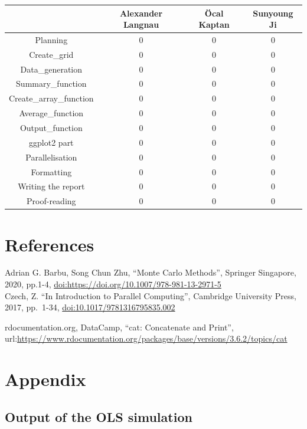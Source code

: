 \documentclass[11pt,a4paper]{article}
\begin{document}
\begin{longtable}[]{@{}cccc@{}}
\toprule()
& Alexander Langnau & Öcal Kaptan & Sunyoung Ji \\
\midrule()
\endhead
Planning & 0 & 0 & 0 \\
Create\_grid & 0 & 0 & 0 \\
Data\_generation & 0 & 0 & 0 \\
Summary\_function & 0 & 0 & 0 \\
Create\_array\_function & 0 & 0 & 0 \\
Average\_function & 0 & 0 & 0 \\
Output\_function & 0 & 0 & 0 \\
ggplot2 part & 0 & 0 & 0 \\
Parallelisation & 0 & 0 & 0 \\
Formatting & 0 & 0 & 0 \\
Writing the report & 0 & 0 & 0 \\
Proof-reading & 0 & 0 & 0 \\
\bottomrule()
\end{longtable}

\pagebreak

\hypertarget{references}{%
\section{References}\label{references}}

Adrian G. Barbu, Song Chun Zhu, ``Monte Carlo Methods'', Springer
Singapore, 2020, pp.1-4,
\url{doi:https://doi.org/10.1007/978-981-13-2971-5}\\

Czech, Z. ``In Introduction to Parallel Computing'', Cambridge
University Press, 2017, pp.~1-34, \url{doi:10.1017/9781316795835.002}

rdocumentation.org, DataCamp, ``cat: Concatenate and Print'',
url:\url{https://www.rdocumentation.org/packages/base/versions/3.6.2/topics/cat}

\pagebreak

\hypertarget{appendix}{%
\section{Appendix}\label{appendix}}

\hypertarget{output-of-the-ols-simulation}{%
\subsection{Output of the OLS
simulation}\label{output-of-the-ols-simulation}}
\end{document}

